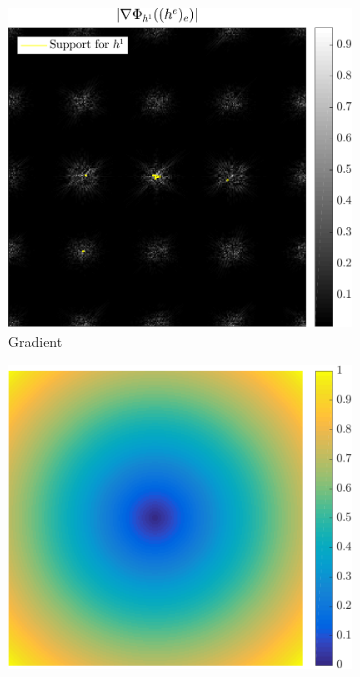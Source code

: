 \begin{figure}[!h] \centering
\begin{subfigure}[b]{0.325\textwidth}\centering
\includegraphics[width=1\textwidth]{figures/tree-scattered-supports/grad_node1.pdf}
\caption{Gradient }\label{}
\end{subfigure}
\begin{subfigure}[b]{0.325\textwidth}\centering
\includegraphics[width=1\textwidth]{figures/tree-scattered-supports/dist_to_orig.pdf}

\end{subfigure}
\end{figure}
